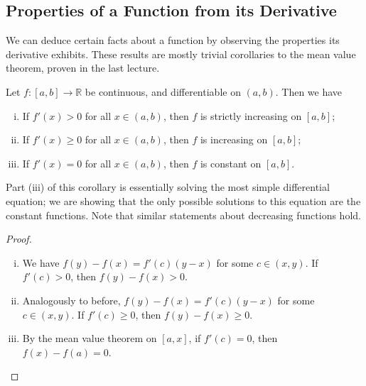 \subsection{Properties of a Function from its Derivative}
We can deduce certain facts about a function by observing the properties its derivative exhibits.
These results are mostly trivial corollaries to the mean value theorem, proven in the last lecture.
\begin{corollary}
	Let \(f \colon [a,b] \to \mathbb R\) be continuous, and differentiable on \((a, b)\).
	Then we have
	\begin{enumerate}[(i)]
		\item If \(f'(x) > 0\) for all \(x \in (a, b)\), then \(f\) is strictly increasing on \([a, b]\);
		\item If \(f'(x) \geq 0\) for all \(x \in (a, b)\), then \(f\) is increasing on \([a, b]\);
		\item If \(f'(x) = 0\) for all \(x \in (a, b)\), then \(f\) is constant on \([a, b]\).
	\end{enumerate}
\end{corollary}
\noindent Part (iii) of this corollary is essentially solving the most simple differential equation; we are showing that the only possible solutions to this equation are the constant functions.
Note that similar statements about decreasing functions hold.
\begin{proof}
	\begin{enumerate}[(i)]
		\item We have \(f(y) - f(x) = f'(c)(y-x)\) for some \(c \in (x, y)\).
		      If \(f'(c) > 0\), then \(f(y) - f(x) > 0\).
		\item Analogously to before, \(f(y) - f(x) = f'(c)(y-x)\) for some \(c \in (x, y)\).
		      If \(f'(c) \geq 0\), then  \(f(y) - f(x) \geq 0\).
		\item By the mean value theorem on \([a, x]\), if \(f'(c) = 0\), then \(f(x) - f(a) = 0\).
	\end{enumerate}
\end{proof}

